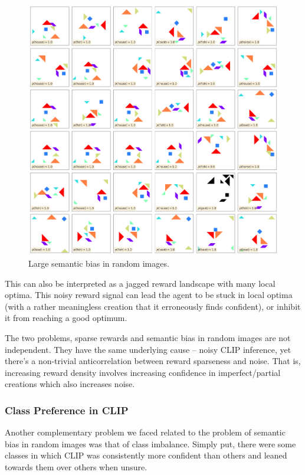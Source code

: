\begin{figure}[h]
    \centering
    \includegraphics[width=\textwidth]{images/adversarial_samples.png}
    \caption{Large semantic bias in random images.}
    \label{fig:semantic-bias-random}
\end{figure}

This can also be interpreted as a jagged reward landscape with many local optima.
This noisy reward signal can lead the agent to be stuck in local optima (with a rather meaningless creation that it erroneously finds confident), or inhibit it from reaching a good optimum.

The two problems, sparse rewards and semantic bias in random images are not independent.
They have the same underlying cause -- noisy CLIP inference, yet there's a non-trivial anticorrelation between reward sparseness and noise.
That is, increasing reward density involves increasing confidence in imperfect/partial creations which also increases noise.


\subsubsection{Class Preference in CLIP}
\label{sec:class-preference}
Another complementary problem we faced related to the problem of semantic bias in random images was that of class imbalance.
Simply put, there were some classes in which CLIP was consistently more confident than others and leaned towards them over others when unsure.

